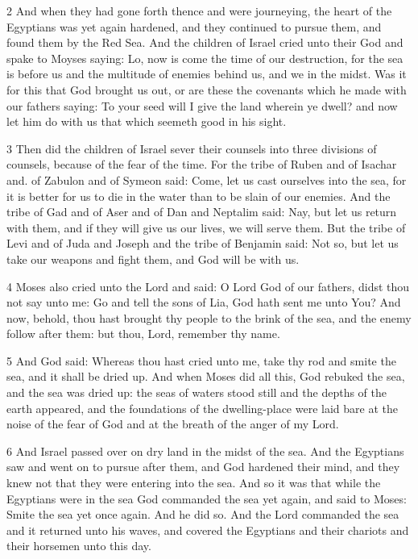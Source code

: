 \par 2 And when they had gone forth thence and were journeying, the heart of the Egyptians was yet again hardened, and they continued to pursue them, and found them by the Red Sea. And the children of Israel cried unto their God and spake to Moyses saying: Lo, now is come the time of our destruction, for the sea is before us and the multitude of enemies behind us, and we in the midst. Was it for this that God brought us out, or are these the covenants which he made with our fathers saying: To your seed will I give the land wherein ye dwell? and now let him do with us that which seemeth good in his sight. 

\par 3 Then did the children of Israel sever their counsels into three divisions of counsels, because of the fear of the time. For the tribe of Ruben and of Isachar and. of Zabulon and of Symeon said: Come, let us cast ourselves into the sea, for it is better for us to die in the water than to be slain of our enemies. And the tribe of Gad and of Aser and of Dan and Neptalim said: Nay, but let us return with them, and if they will give us our lives, we will serve them. But the tribe of Levi and of Juda and Joseph and the tribe of Benjamin said: Not so, but let us take our weapons and fight them, and God will be with us. 

\par 4 Moses also cried unto the Lord and said: O Lord God of our fathers, didst thou not say unto me: Go and tell the sons of Lia, God hath sent me unto You? And now, behold, thou hast brought thy people to the brink of the sea, and the enemy follow after them: but thou, Lord, remember thy name. 

\par 5 And God said: Whereas thou hast cried unto me, take thy rod and smite the sea, and it shall be dried up. And when Moses did all this, God rebuked the sea, and the sea was dried up: the seas of waters stood still and the depths of the earth appeared, and the foundations of the dwelling-place were laid bare at the noise of the fear of God and at the breath of the anger of my Lord.

\par 6 And Israel passed over on dry land in the midst of the sea. And the Egyptians saw and went on to pursue after them, and God hardened their mind, and they knew not that they were entering into the sea. And so it was that while the Egyptians were in the sea God commanded the sea yet again, and said to Moses: Smite the sea yet once again. And he did so. And the Lord commanded the sea and it returned unto his waves, and covered the Egyptians and their chariots and their horsemen unto this day.

